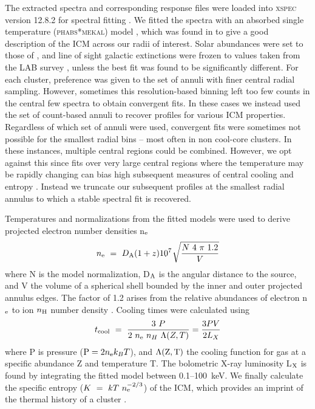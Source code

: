 \documentclass[twocolumn]{aastex6}
\begin{document}
The extracted spectra and corresponding response files were loaded into \textsc{xspec} version 12.8.2 for spectral fitting \cite[][]{Arnaud96}. We fitted the spectra with an absorbed single temperature (\textsc{phabs}*\textsc{mekal}) model \cite[][]{Mewe85,Balucinska-Church92,Liedahl95}, which was found in \citet[][]{Hogan17} to give a good description of the ICM across our radii of interest.  Solar abundances were set to those of \citet[][]{Anders89}, and line of sight galactic extinctions were frozen to values taken from the LAB survey \cite[][]{Kalberla05}, unless the best fit was found to be significantly different.  For each cluster, preference was given to the set of annuli with finer central radial sampling.  However, sometimes this resolution-based binning left too few counts in the central few spectra to obtain convergent fits.  In these cases we instead used the set of count-based annuli to recover profiles for various ICM properties.  Regardless of which set of annuli were used, convergent fits were sometimes not possible for the smallest radial bins -- most often in non cool-core clusters.  In these instances, multiple central regions could be combined.  However, we opt against this since fits over very large central regions where the temperature may be rapidly changing can bias high subsequent measures of central cooling and entropy \cite[][]{Panagoulia14a,Hogan17}.  Instead we truncate our subsequent profiles at the smallest radial annulus to which a stable spectral fit is recovered.

Temperatures and normalizations from the fitted models were used to derive projected electron number densities n$_{\rm e}$
\begin{equation}
 n_{\rm e}~=~D_{\rm A}(1+z)10^{7}~\sqrt[]{\frac{N~4~\pi~1.2}{V}}
\end{equation}
where N is the model normalization, D$_{\rm A}$ is the angular distance to the source, and V the volume of a spherical shell bounded by the inner and outer projected annulus edges.  The factor of 1.2 arises from the relative abundances of electron n$_{\rm e}$ to ion $n_{\rm H}$ number density \cite[][]{Anders89}.  Cooling times were calculated using 
\begin{equation}
 t_{\rm cool}~=~\frac{3~P}{2~n_{\rm e}~n_{H}~\Lambda(Z,T)} = \frac{3PV}{2L_{X}}
\end{equation}
where P is pressure (${\rm P}=2n_{\rm e}k_{B}T$), and $\Lambda({\rm Z,T})$ the cooling function for gas at a specific abundance Z and temperature T.  The bolometric X-ray luminosity L$_{\rm X}$ is found by integrating the fitted model between 0.1--100~keV.  We finally calculate the specific entropy ($K~=~kT~n_{\rm e}^{-2/3}$) of the ICM, which provides an imprint of the thermal history of a cluster \cite[][]{Panagoulia14a}.
\end{document}
